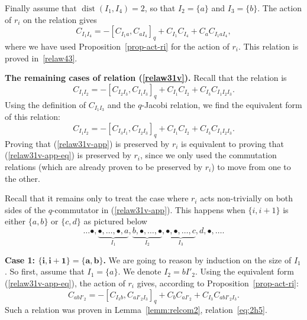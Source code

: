\documentclass[pdftex]{sigma}
\numberwithin{equation}{section}
\theoremstyle{definition}
\begin{document}
Finally assume that $\operatorname{dist}(I_1,I_4)=2$, so that $I_2=\{a\}$ and $I_3=\{b\}$. The action of $r_i$ on the relation gives
\[C_{I_1I_4}=-[C_{I_1a},C_{aI_4}]_q+C_{I_1}C_{I_4}+C_{a}C_{I_1aI_4} ,\]
where we have used Proposition~\ref{prop-act-ri} for the action of $r_i$. This relation is proved in~\eqref{relaw43}.

{\bf The remaining cases of relation (\ref{relaw31v}).} Recall that the relation is
\begin{equation}\label{relaw31v-app}
C_{I_1I_2}=-[C_{I_2I_3},C_{I_1I_3}]_q+C_{I_1}C_{I_2}+C_{I_3}C_{I_1I_2I_3} .
\end{equation}
Using the definition of $C_{I_1I_3}$ and the $q$-Jacobi relation, we find the equivalent form of this relation:
\begin{equation}\label{relaw31v-app-eq}
C_{I_1I_2}=-[C_{I_3I_1},C_{I_2I_3}]_q+C_{I_1}C_{I_2}+C_{I_3}C_{I_1I_2I_3} .
\end{equation}
Proving that (\ref{relaw31v-app}) is preserved by $r_i$ is equivalent to proving that (\ref{relaw31v-app-eq}) is preserved by $r_i$, since we only used the commutation relations (which are already proven to be preserved by $r_i$) to move from one to the other.


Recall that it remains only to treat the case where $r_i$ acts non-trivially on both sides of the $q$-commutator in (\ref{relaw31v-app}). This happens when $\{i,i+1\}$ is either $\{a,b\}$ or $\{c,d\}$ as pictured below
\[ \ldots \bullet,\underbrace{\bullet,\dots,\bullet,a}_{I_1},\underbrace{b,\bullet,\dots,\bullet}_{I_2},\underbrace{\bullet,\bullet,\dots,c}_{I_3},d,\bullet,\ldots.\]

\textbf{Case 1: $\boldsymbol{\{i,i+1\}=\{a,b\}}$.} We are going to reason by induction on the size of $I_1$. So first, assume that $I_1=\{a\}$. We denote $I_2=bI'_2$. Using the equivalent form (\ref{relaw31v-app-eq}), the action of $r_i$ gives, according to Proposition~\ref{prop-act-ri}:
\[C_{abI'_2}=-[C_{I_3b},C_{aI'_2I_3}]_q+C_{b}C_{aI'_2}+C_{I_3}C_{abI'_2I_3} .\]
Such a relation was proven in Lemma~\ref{lemm:relcom2}, relation~\eqref{eq:2h5}.
\end{document}
